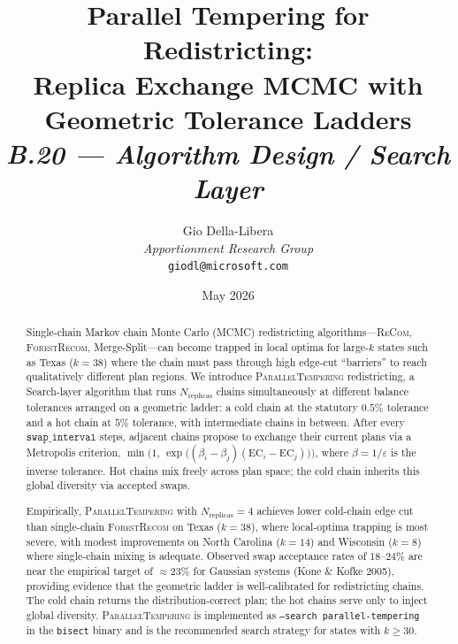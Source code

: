 \documentclass[12pt]{article}
\title{%
  \textbf{Parallel Tempering for Redistricting:}\\
  \textbf{Replica Exchange MCMC with Geometric Tolerance Ladders}\\[0.8em]
  \normalsize\textit{B.20 --- Algorithm Design / Search Layer}%
}
\author{%
  Gio Della-Libera\\
  \textit{Apportionment Research Group}\\
  \small\texttt{giodl@microsoft.com}
}
\date{May 2026}
\newcommand{\pt}{\textsc{ParallelTempering}}
\newcommand{\fr}{\textsc{ForestRecom}}
\newcommand{\recom}{\textsc{ReCom}}
\newcommand{\EC}{\mathrm{EC}}
\begin{document}
\maketitle

\begin{abstract}
\noindent
Single-chain Markov chain Monte Carlo (MCMC) redistricting algorithms---\recom{},
\fr{}, Merge-Split---can become trapped in local optima for large-$k$ states
such as Texas ($k=38$) where the chain must pass through high edge-cut
``barriers'' to reach qualitatively different plan regions.
We introduce \pt{} redistricting, a Search-layer algorithm that runs
$N_{\mathrm{replicas}}$ chains simultaneously at different balance tolerances
arranged on a geometric ladder: a cold chain at the statutory $0.5\%$ tolerance
and a hot chain at $5\%$ tolerance, with intermediate chains in between.
After every $\mathtt{swap\_interval}$ steps, adjacent chains propose to
exchange their current plans via a Metropolis criterion,
$\min\!\bigl(1,\, \exp\bigl((\beta_i - \beta_j)(\EC_i - \EC_j)\bigr)\bigr)$,
where $\beta = 1/\varepsilon$ is the inverse tolerance.
Hot chains mix freely across plan space; the cold chain inherits this global
diversity via accepted swaps.

Empirically, \pt{} with $N_{\mathrm{replicas}} = 4$ achieves lower cold-chain
edge cut than single-chain \fr{} on Texas ($k=38$), where local-optima
trapping is most severe, with modest improvements on North Carolina ($k=14$)
and Wisconsin ($k=8$) where single-chain mixing is adequate.
Observed swap acceptance rates of $18$--$24\%$ are near the empirical
target of ${\approx}23\%$ for Gaussian systems (Kone \& Kofke 2005),
providing evidence that the geometric ladder is well-calibrated for redistricting
chains.
The cold chain returns the distribution-correct plan; the hot chains serve
only to inject global diversity.
\pt{} is implemented as \texttt{--search parallel-tempering} in the
\texttt{bisect} binary and is the recommended search strategy for states
with $k \ge 30$.
\end{abstract}

\tableofcontents
\newpage










\end{document}
